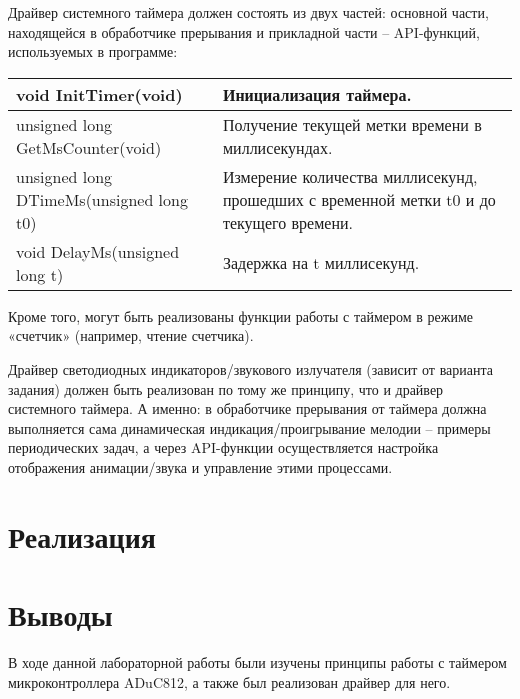 \documentclass[a4paper,12pt]{article}
\begin{document}
Драйвер системного таймера должен состоять из двух частей: основной части,
находящейся в обработчике прерывания и прикладной части – API-функций, используемых в
программе:

\bigskip
\begin{tabularx}{\textwidth}{|X|X|}
    \hline
    void InitTimer(void)                    & Инициализация таймера. \\\hline
    unsigned long GetMsCounter(void)        & Получение текущей метки времени в миллисекундах. \\\hline
    unsigned long DTimeMs(unsigned long t0) & Измерение количества миллисекунд, прошедших с временной метки t0 и до текущего времени. \\\hline
    void DelayMs(unsigned long t)           & Задержка на t миллисекунд. \\\hline
\end{tabularx}
\bigskip

Кроме того, могут быть реализованы функции работы с таймером в режиме «счетчик»
(например, чтение счетчика).

Драйвер светодиодных индикаторов/звукового излучателя (зависит от варианта
задания) должен быть реализован по тому же принципу, что и драйвер системного таймера.
А именно: в обработчике прерывания от таймера должна выполняется сама динамическая
индикация/проигрывание мелодии – примеры периодических задач, а через API-функции
осуществляется настройка отображения анимации/звука и управление этими процессами.

\section{Реализация}








\section{Выводы}
В ходе данной лабораторной работы были изучены принципы работы с таймером 
микроконтроллера ADuC812, а также был реализован драйвер для него.
\end{document}
